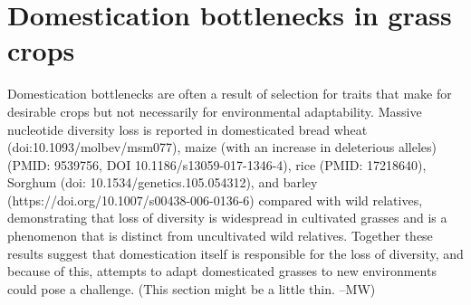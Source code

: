 \documentclass[12pt]{article}
\begin{document}
\section{Domestication bottlenecks in grass crops}
Domestication bottlenecks are often a result of selection for traits that make for desirable crops but not necessarily for environmental adaptability. Massive nucleotide diversity loss is reported in domesticated bread wheat (doi:10.1093/molbev/msm077), maize (with an increase in deleterious alleles) (PMID: 9539756, DOI 10.1186/s13059-017-1346-4), rice (PMID: 17218640), Sorghum (doi:  10.1534/genetics.105.054312), and barley (https://doi.org/10.1007/s00438-006-0136-6) compared with wild relatives, demonstrating that loss of diversity is widespread in cultivated grasses and is a phenomenon that is distinct from uncultivated wild relatives. Together these results suggest that domestication itself is responsible for the loss of diversity, and because of this, attempts to adapt domesticated grasses to new environments could pose a challenge. (This section might be a little thin. --MW)
\end{document}
